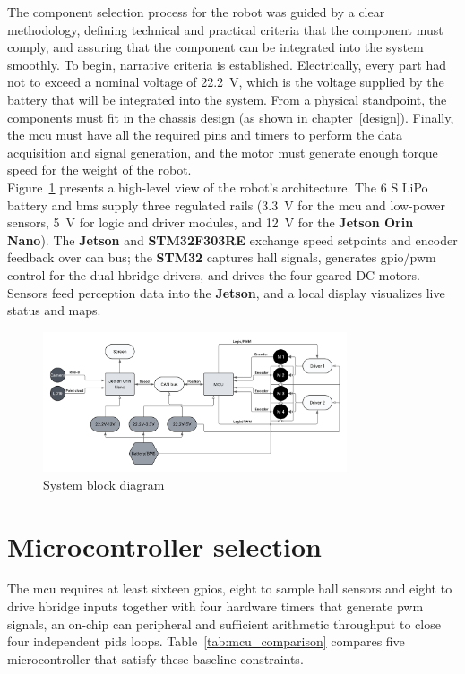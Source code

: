 The component selection process for the robot was guided by a clear methodology, defining technical and practical criteria that the component must comply, and assuring that the component can be integrated into the system smoothly.
To begin, narrative criteria is established. Electrically, every part had not to exceed a nominal voltage of \SI{22.2}{\volt}, which is the voltage supplied by the battery that will be integrated into the system. From a physical standpoint, the components must fit in the chassis design (as shown in chapter~\ref{design}). Finally, the \gls{mcu} must have all the required pins and timers to perform the data acquisition and signal generation, and the motor must generate enough torque speed for the weight of the robot.\\
Figure~\ref{fig:block-diagram} presents a high-level view of the robot's architecture. The 6 S LiPo battery and \gls{bms} supply three regulated rails (\SI{3.3}{\volt} for the \gls{mcu} and low-power sensors, \SI{5}{\volt} for logic and driver modules, and \SI{12}{\volt} for the \textbf{Jetson Orin Nano}). The \textbf{Jetson} and \textbf{STM32F303RE} exchange speed setpoints and encoder feedback over \gls{can} bus; the \textbf{STM32} captures \gls{hall} signals, generates \gls{gpio}/\gls{pwm} control for the dual \gls{hbridge} drivers, and drives the four geared DC motors. Sensors feed perception data into the \textbf{Jetson}, and a local display visualizes live status and maps.

\begin{figure}[H]
  \centering
  \includegraphics[width=0.8\textwidth]{imgs/blockdiagram.png}
  \caption{System block diagram}
  \label{fig:block-diagram}
\end{figure}

\section{Microcontroller selection}

The \gls{mcu} requires at least sixteen \glspl{gpio}, eight to sample \gls{hall} sensors and eight to drive \gls{hbridge} inputs together with four hardware timers that generate \gls{pwm} signals, an on-chip \gls{can} peripheral and sufficient arithmetic throughput to close four independent \glspl{pid} loops.
Table~\ref{tab:mcu_comparison} compares five microcontroller that satisfy these baseline constraints.

